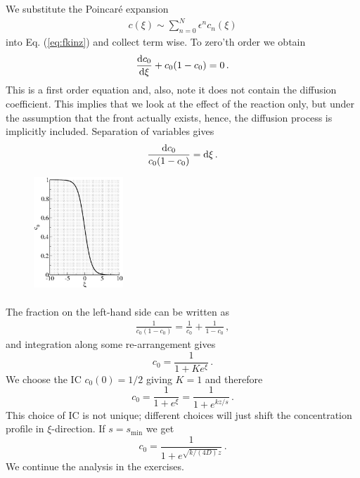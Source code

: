 We substitute the Poincar\'{e} expansion 
\begin{eqnarray}
	c(\xi) \sim \sum_{n=0}^N \epsilon^n c_n(\xi)
\end{eqnarray}
into Eq. (\ref{eq:fkinz}) and collect term wise. To zero'th order we obtain
\begin{equation}
\frac{\mathrm{d} c_0}{\mathrm{d} \xi} + c_0(1-c_0)=0 \, .
\end{equation}
This is a first order equation and, also, note it does not contain the diffusion
coefficient. This implies that we look at the effect of the reaction only, but
under the assumption that the front actually exists, hence, the diffusion process is 
implicitly included. Separation of variables gives
\begin{equation}
\frac{\mathrm{d} c_0}{c_0(1-c_0)} = \mathrm{d} \xi \, .
\end{equation}
\begin{figure}
	\centering
	\includegraphics[width=0.3\textwidth]{figs/fku0.eps}
\end{figure}
\paragraph{}
\vspace*{-\parskip}
The fraction on the left-hand side can be written as
\begin{eqnarray}
	\frac{1}{c_0(1-c_0)} = \frac{1}{c_0} + \frac{1}{1-c_0} \, ,
\end{eqnarray}
and integration along some re-arrangement gives
\begin{equation}
	c_0 = \frac{1}{1+Ke^{\xi}} \, .
\end{equation}
We choose the IC $c_0(0)=1/2$ giving $K=1$ and therefore
\begin{equation}
c_0 = \frac{1}{1+e^{\xi}} = \frac{1}{1+e^{kz/s}} \, .
\end{equation}
This choice of IC is not unique; different choices will just shift the 
concentration profile in $\xi$-direction. If $s=s_\text{min}$ we get
\begin{equation}
\label{eq:u0fk} 
c_0 = \frac{1}{1+e^{\sqrt{k/(4D)}z}} \, .
\end{equation}
We continue the analysis in the exercises.

